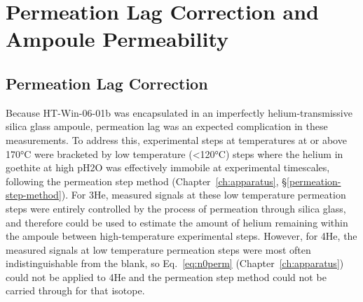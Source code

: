 %

\section{Permeation Lag Correction and Ampoule Permeability}\label{sec:ch2-si-permeation}

\subsection{Permeation Lag Correction}\label{permeation-lag-correction}

Because HT-Win-06-01b was encapsulated in an imperfectly
helium-transmissive silica glass ampoule, permeation lag was an expected complication in these
measurements. To address this, experimental steps at temperatures at or above 170°C were bracketed by low temperature
(\textless120°C) steps where the helium in goethite at high pH2O was
effectively immobile at experimental timescales, following the permeation step method (Chapter~\ref{ch:apparatus}, \S\ref{permeation-step-method}). For 3He, measured
signals at these low temperature permeation steps were entirely
controlled by the process of permeation through silica glass, and
therefore could be used to estimate the amount of helium remaining within the
ampoule between high-temperature experimental steps. However, for 4He,
the measured signals at low temperature permeation steps were most often
indistinguishable from the blank, so Eq.~\eqref{eq:n0perm} (Chapter~\ref{ch:apparatus}) could not be
applied to 4He and the permeation step method could not be carried through for that isotope.

